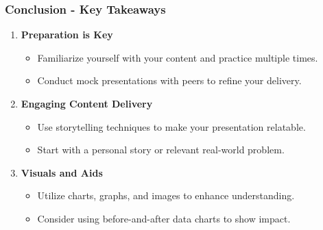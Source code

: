 \documentclass[aspectratio=169]{beamer}
\begin{document}
\begin{frame}[fragile]
    \frametitle{Conclusion - Key Takeaways}
    \begin{enumerate}
        \item \textbf{Preparation is Key}
        \begin{itemize}
            \item Familiarize yourself with your content and practice multiple times.
            \item Conduct mock presentations with peers to refine your delivery.
        \end{itemize}
        
        \item \textbf{Engaging Content Delivery}
        \begin{itemize}
            \item Use storytelling techniques to make your presentation relatable.
            \item Start with a personal story or relevant real-world problem.
        \end{itemize}
        
        \item \textbf{Visuals and Aids}
        \begin{itemize}
            \item Utilize charts, graphs, and images to enhance understanding.
            \item Consider using before-and-after data charts to show impact.
        \end{itemize}
    \end{enumerate}
\end{frame}
\end{document}
